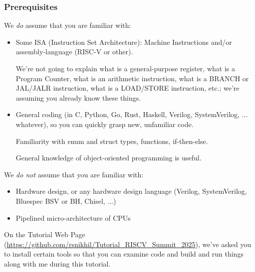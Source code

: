 
\begin{frame}[fragile]

\frametitle{Prerequisites}

\begin{center}\scriptsize
 \begin{minipage}{0.9\textwidth}
  We \emph{do} assume that you are familiar with:
  \begin{itemize}

   \item Some ISA (Instruction Set Architecture): Machine Instructions
     and/or assembly-language (RISC-V or other).

     \vspace*{1ex}

     We're not going to explain what is a general-purpose register,
     what is a Program Counter, what is an arithmetic instruction,
     what is a BRANCH or JAL/JALR instruction, what is a LOAD/STORE
     instruction, etc.; we're assuming you already know these things.

   \vspace*{1ex}

   \item General coding (in C, Python, Go, Rust, Haskell, Verilog,
     SystemVerilog, ... whatever), so you can quickly grasp new,
     unfamiliar code.

     Familiarity with enum and struct types, functions, if-then-else.

     General knowledge of object-oriented programming is useful.
  \end{itemize}

  \vspace*{5ex}

  We \emph{do not} assume that you are familiar with:
  \begin{itemize}

   \item Hardware design, or any hardware design language (Verilog,
     SystemVerilog, Bluespec BSV or BH, Chisel, ...)

   \item Pipelined micro-architecture of CPUs

  \end{itemize}

  \vspace*{5ex}

  On the Tutorial Web Page
    (\url{https://github.com/rsnikhil/Tutorial_RISCV_Summit_2025}),
    we've asked you to install certain tools so that you can examine
    code and build and run things along with me during this tutorial.


\end{minipage}
\end{center}
\end{frame}

